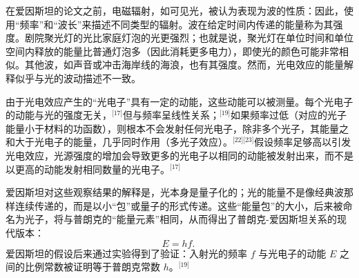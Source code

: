 在爱因斯坦的论文之前，电磁辐射，如可见光，被认为表现为波的性质：因此，使用“频率”和“波长”来描述不同类型的辐射。波在给定时间内传递的能量称为其强度。剧院聚光灯的光比家庭灯泡的光更强烈；也就是说，聚光灯在单位时间和单位空间内释放的能量比普通灯泡多（因此消耗更多电力），即使光的颜色可能非常相似。其他波，如声音或冲击海岸线的海浪，也有其强度。然而，光电效应的能量解释似乎与光的波动描述不一致。

由于光电效应产生的“光电子”具有一定的动能，这些动能可以被测量。每个光电子的动能与光的强度无关，\(^\text{[17]}\)但与频率呈线性关系；\(^\text{[19]}\)如果频率过低（对应的光子能量小于材料的功函数），则根本不会发射任何光电子，除非多个光子，其能量之和大于光电子的能量，几乎同时作用（多光子效应）。\(^\text{[22][23]}\)假设频率足够高以引发光电效应，光源强度的增加会导致更多的光电子以相同的动能被发射出来，而不是以更高的动能发射相同数量的光电子。\(^\text{[17]}\)

爱因斯坦对这些观察结果的解释是，光本身是量子化的；光的能量不是像经典波那样连续传递的，而是以小“包”或量子的形式传递。这些“能量包”的大小，后来被命名为光子，将与普朗克的“能量元素”相同，从而得出了普朗克-爱因斯坦关系的现代版本：
\[
E = hf.~
\]
爱因斯坦的假设后来通过实验得到了验证：入射光的频率 \( f \) 与光电子的动能 \( E \) 之间的比例常数被证明等于普朗克常数 \( h \)。\(^\text{[19]}\)